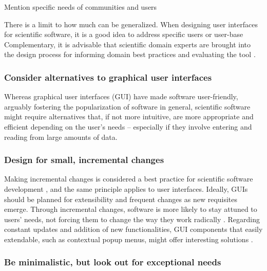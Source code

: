 \note Mention specific needs of communities and  users

There is a limit to how much can be generalized. When designing user interfaces for scientific software, it is a good idea to address specific users or user-base \cite {Javahery:2004, DeRoure:2009} Complementary, it is advisable that scientific domain experts are brought into the design process for  informing domain best practices \cite{Schraefel:2004,  DeMatos:2013} and evaluating the tool \cite{Keefe:2010}.


\subsubsection{Consider alternatives to graphical user interfaces}

Whereas graphical user interfaces (GUI) have made software user-friendly, arguably fostering the popularization of software in general, scientific software might require alternatives that, if not more intuitive, are more appropriate and efficient depending on the user's needs – especially if they involve entering and reading from large amounts of data. 
 

\subsubsection{Design for small, incremental changes}
Making incremental changes is considered a best practice for scientific software development  \cite{bestprSC}, and the same principle applies to user interfaces. Ideally, GUIs should be planned for extensibility and frequent changes as new requisites emerge. Through incremental changes, software is more likely to stay attuned to users' needs, not forcing them to change the way they work radically  \cite{DeRoure:2009}. Regarding constant updates and addition of new functionalities, GUI components that easily extendable, such as contextual popup menus, might offer interesting solutions \cite{MacLeod:1992}. 

\subsubsection{Be minimalistic, but look out for exceptional needs}

